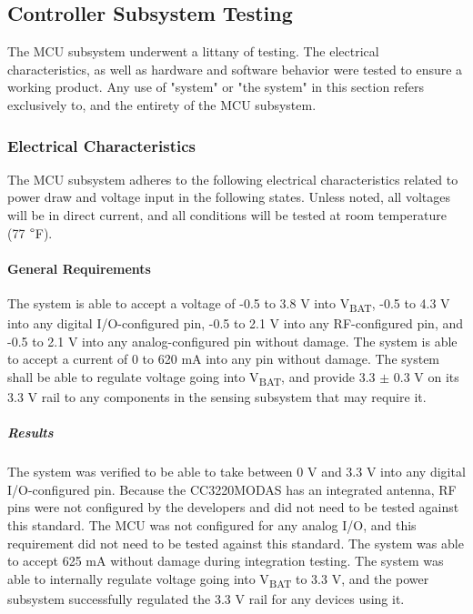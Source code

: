 \subsection{Controller Subsystem Testing}
\label{sec:controller_subsystem_testing}
The MCU subsystem underwent a littany of testing. The electrical
characteristics, as well as hardware and software behavior were tested to
ensure a working product. Any use of "system" or "the system" in this section refers exclusively to, and the entirety of the MCU subsystem.

\subsubsection{Electrical Characteristics}
The MCU subsystem adheres to the following electrical characteristics
related to power draw and voltage input in the following states. Unless noted,
all voltages will be in direct current, and all conditions will be tested at
room temperature (77 $\degree$F). 

\paragraph{General Requirements} The system is able to accept a voltage
of -0.5 to 3.8 V into V\textsubscript{BAT}, -0.5 to 4.3 V into any digital
I/O-configured pin, -0.5 to 2.1 V into any RF-configured pin, and -0.5 to 2.1 V
into any analog-configured pin without damage. The system is able to
accept a current of 0 to 620 mA into any pin without damage. The system shall
be able to regulate voltage going into V\textsubscript{BAT}, and provide 3.3 $\pm$ 0.3 V
on its 3.3 V rail to any components in the sensing
subsystem that may require it.
\subparagraph{Results} The system was verified to be able to take between 0 V and 3.3 V into any digital I/O-configured pin. Because the CC3220MODAS has an integrated antenna, RF pins were not configured by the developers and did not need to be tested against this standard. The MCU was not configured for any analog I/O, and this requirement did not need to be tested against this standard. The system was able to accept 625 mA without damage during integration testing. The system was able to internally regulate voltage going into V\textsubscript{BAT} to 3.3 V, and the power subsystem successfully regulated the 3.3 V rail for any devices using it.

